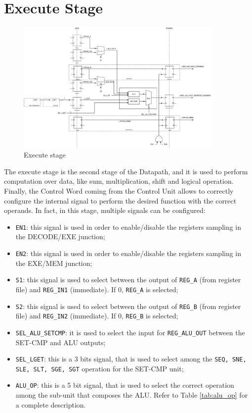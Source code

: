 \chapter{Execute Stage}

\begin{figure}[H]   
    \centering
    \includegraphics[width=0.9\textwidth]{chapters/5_ExecuteStage/images/exe_stage.pdf}
    \caption{Execute stage}
    \label{fig:execute-stage}
\end{figure}

The execute stage is the second stage of the Datapath, and it is used to perform computation over data, like sum, multiplication, shift and logical operation. Finally, the Control Word coming from the Control Unit allows to correctly configure the internal signal to perform the desired function with the correct operands. In fact, in this stage, multiple signals can be configured:
\begin{itemize}
    \itemsep0sp
    \item \texttt{EN1}: this signal is used in order to enable/disable the registers sampling in the DECODE/EXE junction;
    \item \texttt{EN2}: this signal is used in order to enable/disable the registers sampling in the EXE/MEM junction;
    \item \texttt{S1}: this signal is used to select between the output of \texttt{REG\_A} (from register file) and \texttt{REG\_IN1} (immediate). If 0, \texttt{REG\_A} is selected;
    \item \texttt{S2}: this signal is used to select between the output of \texttt{REG\_B} (from register file) and \texttt{REG\_IN2} (immediate). If 0, \texttt{REG\_B} is selected;
    \item \texttt{SEL\_ALU\_SETCMP}: it is used to select the input for \texttt{REG\_ALU\_OUT} between the SET-CMP and ALU outputs;
    \item \texttt{SEL\_LGET}: this is a 3 bits signal, that is used to select among the \texttt{SEQ, SNE, SLE, SLT, SGE, SGT} operation for the SET-CMP unit;
    \item \texttt{ALU\_OP}: this is a 5 bit signal, that is used to select the correct operation among the sub-unit that composes the ALU. Refer to Table \ref{tab:alu_op} for a complete description.
    
\end{itemize}


